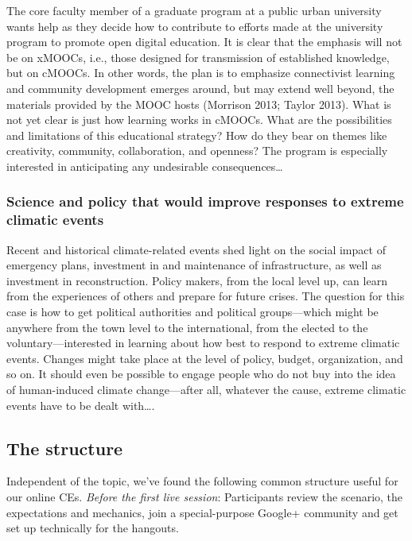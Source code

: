The core faculty member of a graduate program at a public urban
university wants help as they decide how to contribute to efforts made
at the university program to promote open digital education. It is clear
that the emphasis will not be on xMOOCs, i.e., those designed for
transmission of established knowledge, but on cMOOCs. In other words,
the plan is to emphasize connectivist learning and community development
emerges around, but may extend well beyond, the materials provided by
the MOOC hosts (Morrison 2013; Taylor 2013). What is not yet clear is
just how learning works in cMOOCs. What are the possibilities and
limitations of this educational strategy? How do they bear on themes
like creativity, community, collaboration, and openness? The program is
especially interested in anticipating any undesirable
consequences\ldots{}

\hypertarget{science-and-policy-that-would-improve-responses-to-extreme-climatic-events}{%
\subsubsection{Science and policy that would improve responses to
extreme climatic
events}\label{science-and-policy-that-would-improve-responses-to-extreme-climatic-events}}

Recent and historical climate-related events shed light on the social
impact of emergency plans, investment in and maintenance of
infrastructure, as well as investment in reconstruction. Policy makers,
from the local level up, can learn from the experiences of others and
prepare for future crises. The question for this case is how to get
political authorities and political groups---which might be anywhere
from the town level to the international, from the elected to the
voluntary---interested in learning about how best to respond to extreme
climatic events. Changes might take place at the level of policy,
budget, organization, and so on. It should even be possible to engage
people who do not buy into the idea of human-induced climate
change---after all, whatever the cause, extreme climatic events have to
be dealt with\ldots.

\hypertarget{the-structure}{%
\subsection{The structure}\label{the-structure}}

Independent of the topic, we've found the following common structure
useful for our online CEs. \emph{Before the first live session}:
Participants review the scenario, the expectations and mechanics, join a
special-purpose Google+ community and get set up technically for the
hangouts.

